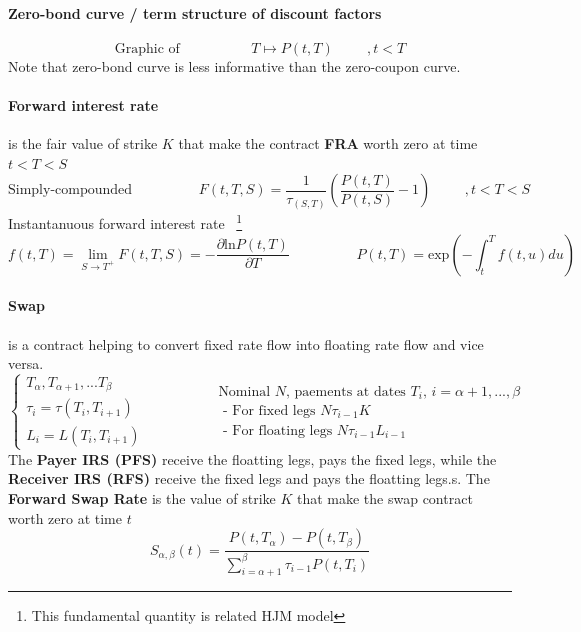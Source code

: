 \documentclass[a4paper,10pt]{article}
\newcommand{\PtT}{P(t,T)}
\newcommand{\PtS}{P(t,S)}
\newcommand{\ftT}{f(t,T)}
\newcommand{\inttT}{\int_t^T}
\newcommand{\FuncExp}{\text{exp}}
\newcommand{\FuncLn}{\text{ln}}
\begin{document}
\paragraph{Zero-bond curve / term structure of discount factors}
\[
\text{Graphic of }
\hspace{2cm}
T \longmapsto \PtT
\hspace{1cm}
,t<T
\]
Note that zero-bond curve is less informative than the zero-coupon curve.
\paragraph{Forward interest rate} is the fair value of strike $K$ that make the contract \textbf{FRA} worth zero at time $t<T<S$  
\[
\text{Simply-compounded}
\hspace{2cm}
F(t,T,S) = \frac{1}{ \tau_{(S,T)} }\left( \frac{\PtT}{\PtS} - 1 \right)
\hspace{1cm}
,t<T<S
\]
Instantanuous forward interest rate ~\footnote{This fundamental quantity is related HJM model}
\[
\ftT = \lim_{S\rightarrow T^+} F(t,T,S) = -\frac{\partial \FuncLn\PtT}{\partial T}
\hspace{2cm}
\PtT = \FuncExp\left( -\inttT f(t,u)du \right)
\]

\paragraph{Swap} is a contract helping to convert fixed rate flow into floating rate flow and vice versa. 
\[
\left\{
\begin{array}{l}
T_{\alpha},T_{\alpha+1},...T_{\beta} \\
\tau_i = \tau(T_i,T_{i+1})           \\
L_i    = L(T_i,T_{i+1})
\end{array}
\right.
\hspace{2cm}
\begin{array}{l}
\text{Nominal $N$, paements at dates $T_i$,  } i=\alpha+1,...,\beta \\
\text{ - For fixed legs    } N\tau_{i-1}K  \\
\text{ - For floating legs } N\tau_{i-1}L_{i-1}  
\end{array}
\]
The \textbf{Payer IRS (PFS)} receive the floatting legs, pays the fixed legs, while the \textbf{Receiver IRS (RFS)} receive the fixed legs and pays the floatting legs.s. The \textbf{Forward Swap Rate} is the value of strike $K$ that make the swap contract worth zero at time $t$
\[
S_{\alpha,\beta}(t) = \frac{P(t,T_{\alpha})-P(t,T_{\beta})}{\sum^{\beta}_{i=\alpha+1}\tau_{i-1}P(t,T_i)} 
\]
\end{document}
